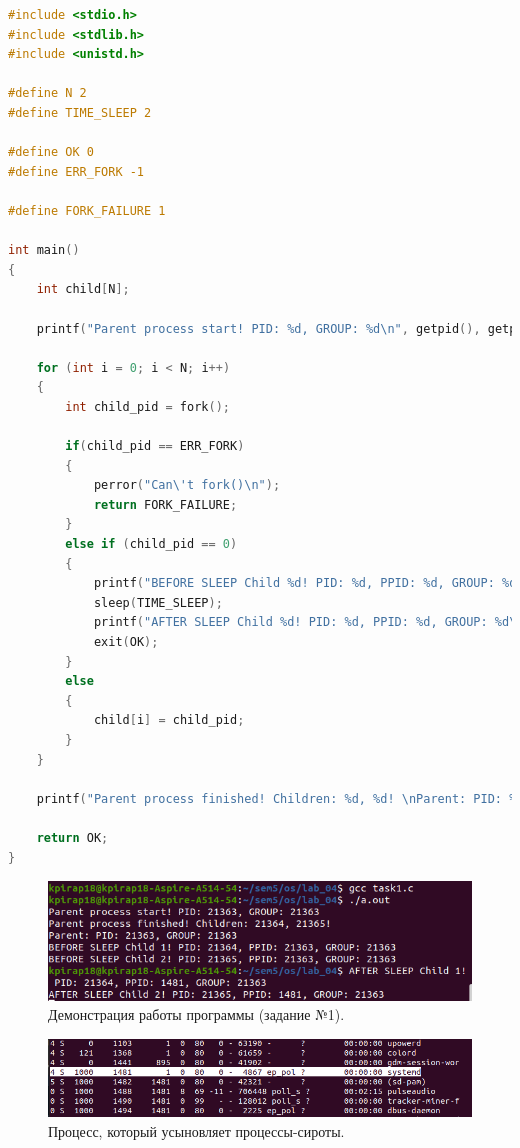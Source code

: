 \documentclass[12pt]{report}
\begin{document}
\begin{lstlisting}[label=some-code,caption=Процессы-сироты,language=C]
#include <stdio.h>
#include <stdlib.h>
#include <unistd.h>

#define N 2
#define TIME_SLEEP 2

#define OK 0
#define ERR_FORK -1

#define FORK_FAILURE 1

int main()
{
	int child[N];
	
	printf("Parent process start! PID: %d, GROUP: %d\n", getpid(), getpgrp());
	
	for (int i = 0; i < N; i++)
	{
		int child_pid = fork();
		
		if(child_pid == ERR_FORK)
		{
			perror("Can\'t fork()\n");
			return FORK_FAILURE;
		}
		else if (child_pid == 0)
		{
			printf("BEFORE SLEEP Child %d! PID: %d, PPID: %d, GROUP: %d \n", i + 1, getpid(), getppid(), getpgrp());
			sleep(TIME_SLEEP);
			printf("AFTER SLEEP Child %d! PID: %d, PPID: %d, GROUP: %d\n",   i + 1, getpid(), getppid(), getpgrp());
			exit(OK);
		}
		else
		{
			child[i] = child_pid;
		}
	}
	
	printf("Parent process finished! Children: %d, %d! \nParent: PID: %d, GROUP: %d\n ", child[0], child[1], getpid(), getpgrp());
	
	return OK;
}
\end{lstlisting}

\begin{figure}[H]

	\centering

	\includegraphics[width=\linewidth]{img/p1.png}
	\caption{Демонстрация работы программы (задание №1).}

	\label{fig:p1}

\end{figure}

\begin{figure}[H]
	
	\centering
	
	\includegraphics[width=\linewidth]{img/p1_2.png}
	\caption{Процесс, который усыновляет процессы-сироты.}
	
	\label{fig:p1_2}
	
\end{figure}
\end{document}
